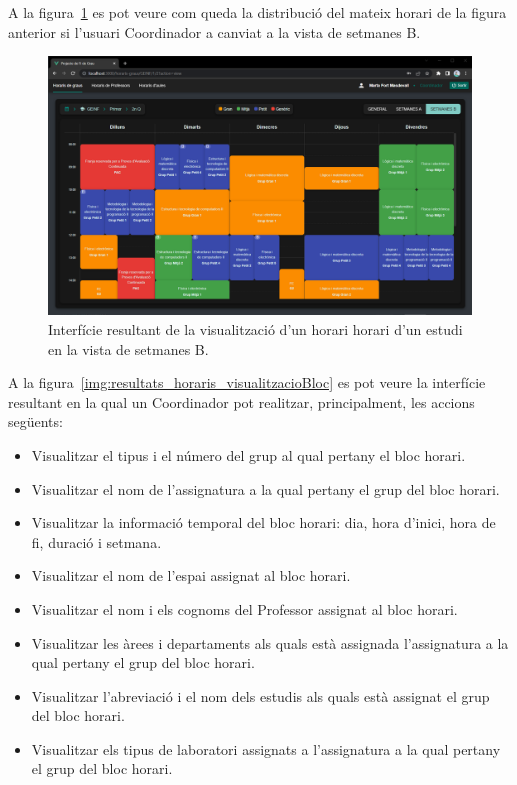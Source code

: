\documentclass[a4paper,12pt]{ThesisStyle}
\begin{document}
A la figura~\ref{img:resultats_horaris_visualitzacioVistaB} es pot veure com queda la distribució del mateix horari de la figura anterior si l'usuari Coordinador a canviat a la vista de setmanes B.

\begin{figure}[H]
  \centering
  \includegraphics[width=\textwidth]{assets/results/horaris/visualitzacioVistaB.png}
  \caption{\label{img:resultats_horaris_visualitzacioVistaB}Interfície resultant de la visualització d'un horari horari d'un estudi en la vista de setmanes B.}
\end{figure}

\newpage

A la figura~\ref{img:resultats_horaris_visualitzacioBloc} es pot veure la interfície resultant en la qual un Coordinador pot realitzar, principalment, les accions següents:
\begin{itemize}
  \item Visualitzar el tipus i el número del grup al qual pertany el bloc horari.
  \item Visualitzar el nom de l'assignatura a la qual pertany el grup del bloc horari.
  \item Visualitzar la informació temporal del bloc horari: dia, hora d'inici, hora de fi, duració i setmana.
  \item Visualitzar el nom de l'espai assignat al bloc horari.
  \item Visualitzar el nom i els cognoms del Professor assignat al bloc horari.
  \item Visualitzar les àrees i departaments als quals està assignada l'assignatura a la qual pertany el grup del bloc horari.
  \item Visualitzar l'abreviació i el nom dels estudis als quals està assignat el grup del bloc horari.
  \item Visualitzar els tipus de laboratori assignats a l'assignatura a la qual pertany el grup del bloc horari.
\end{itemize}
\end{document}
